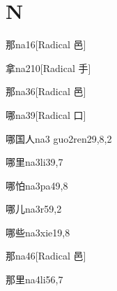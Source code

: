 
\section*{N}

\begin{verbete}{那}{na1}{6}[Radical 邑]
\end{verbete}

\begin{verbete}{拿}{na2}{10}[Radical 手]
\end{verbete}

\begin{verbete}{那}{na3}{6}[Radical 邑]
\end{verbete}

\begin{verbete}{哪}{na3}{9}[Radical 口]
\end{verbete}

\begin{verbete}{哪国人}{na3 guo2ren2}{9,8,2}
\end{verbete}

\begin{verbete}{哪里}{na3li3}{9,7}
\end{verbete}

\begin{verbete}{哪怕}{na3pa4}{9,8}
\end{verbete}

\begin{verbete}{哪儿}{na3r5}{9,2}
\end{verbete}

\begin{verbete}{哪些}{na3xie1}{9,8}
\end{verbete}

\begin{verbete}{那}{na4}{6}[Radical 邑]
\end{verbete}

\begin{verbete}{那里}{na4li5}{6,7}
\end{verbete}

